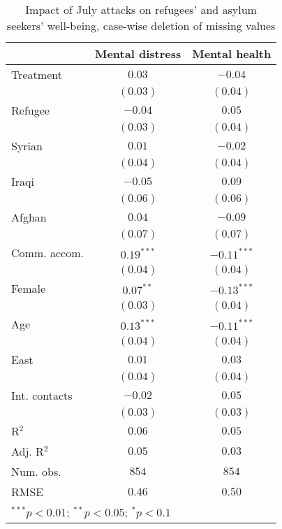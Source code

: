 
\begin{table}
\caption{Impact of July attacks on refugees' and asylum seekers' well-being, case-wise deletion of missing values}
\begin{center}
\begin{tabular}{l c c}
\toprule
 & Mental distress & Mental health \\
\midrule
Treatment     & $0.03$       & $-0.04$       \\
              & $(0.03)$     & $(0.04)$      \\
Refugee       & $-0.04$      & $0.05$        \\
              & $(0.03)$     & $(0.04)$      \\
Syrian        & $0.01$       & $-0.02$       \\
              & $(0.04)$     & $(0.04)$      \\
Iraqi         & $-0.05$      & $0.09$        \\
              & $(0.06)$     & $(0.06)$      \\
Afghan        & $0.04$       & $-0.09$       \\
              & $(0.07)$     & $(0.07)$      \\
Comm. accom.  & $0.19^{***}$ & $-0.11^{***}$ \\
              & $(0.04)$     & $(0.04)$      \\
Female        & $0.07^{**}$  & $-0.13^{***}$ \\
              & $(0.03)$     & $(0.04)$      \\
Age           & $0.13^{***}$ & $-0.11^{***}$ \\
              & $(0.04)$     & $(0.04)$      \\
East          & $0.01$       & $0.03$        \\
              & $(0.04)$     & $(0.04)$      \\
Int. contacts & $-0.02$      & $0.05$        \\
              & $(0.03)$     & $(0.03)$      \\
\midrule
R$^2$         & $0.06$       & $0.05$        \\
Adj. R$^2$    & $0.05$       & $0.03$        \\
Num. obs.     & $854$        & $854$         \\
RMSE          & $0.46$       & $0.50$        \\
\bottomrule
\multicolumn{3}{l}{\scriptsize{$^{***}p<0.01$; $^{**}p<0.05$; $^{*}p<0.1$}}
\end{tabular}
\label{tab_mhealth_na}
\end{center}
\end{table}
